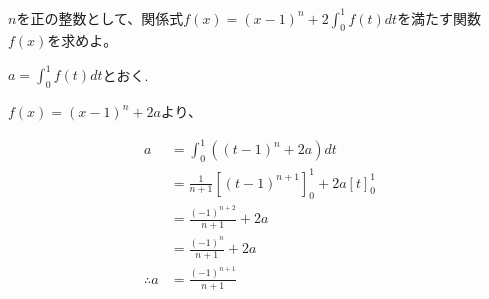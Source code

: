 \begin{problem}
  $n$を正の整数として、関係式$f(x)=(x-1)^n+2 \displaystyle \int^1_0 f(t)dt$を満たす関数$f(x)$を求めよ。
\end{problem}

$a=\displaystyle \int^1_0 f(t)dt$とおく.

$f(x)=(x-1)^n+2a$より、

\begin{align*}
  a &= \displaystyle \int^1_0 \left((t-1)^n+2a\right)dt \\
  &= \frac{1}{n+1}\left[(t-1)^{n+1}\right]^1_0 + 2a\left[t\right]^1_0 \\
  &= \frac{(-1)^{n+2}}{n+1} + 2a \\
  &= \frac{(-1)^n}{n+1} + 2a \\
  \therefore a &= \frac{(-1)^{n+1}}{n+1}
  \end{align*}

